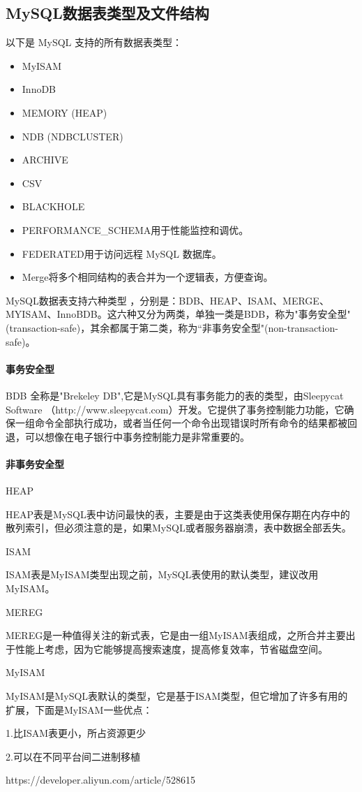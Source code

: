 \documentclass[../../../interview-questions.tex]{subfiles}
\begin{document}
\subsection{MySQL数据表类型及文件结构}

以下是 MySQL 支持的所有数据表类型：

\begin{itemize}
    \item {MyISAM}
    \item {InnoDB}
    \item {MEMORY (HEAP)}
    \item {NDB (NDBCLUSTER)}
    \item {ARCHIVE}
    \item {CSV}
    \item {BLACKHOLE}
    \item {PERFORMANCE\_SCHEMA}用于性能监控和调优。
    \item {FEDERATED}用于访问远程 MySQL 数据库。
    \item {Merge}将多个相同结构的表合并为一个逻辑表，方便查询。
\end{itemize}

MySQL数据表支持六种类型 ，分别是：BDB、HEAP、ISAM、MERGE、MYISAM、InnoBDB。这六种又分为两类，单独一类是BDB，称为"事务安全型"(transaction-safe)，其余都属于第二类，称为“非事务安全型"(non-transaction-safe)。

\paragraph{事务安全型}

BDB 全称是"Brekeley DB",它是MySQL具有事务能力的表的类型，由Sleepycat Software （http://www.sleepycat.com）开发。它提供了事务控制能力功能，它确保一组命令全部执行成功，或者当任何一个命令出现错误时所有命令的结果都被回退，可以想像在电子银行中事务控制能力是非常重要的。

\paragraph{非事务安全型}

HEAP

HEAP表是MySQL表中访问最快的表，主要是由于这类表使用保存期在内存中的散列索引，但必须注意的是，如果MySQL或者服务器崩溃，表中数据全部丢失。

ISAM

ISAM表是MyISAM类型出现之前，MySQL表使用的默认类型，建议改用MyISAM。

MEREG

MEREG是一种值得关注的新式表，它是由一组MyISAM表组成，之所合并主要出于性能上考虑，因为它能够提高搜索速度，提高修复效率，节省磁盘空间。

MyISAM

MyISAM是MySQL表默认的类型，它是基于ISAM类型，但它增加了许多有用的扩展，下面是MyISAM一些优点：

1.比ISAM表更小，所占资源更少

2.可以在不同平台间二进制移植


https://developer.aliyun.com/article/528615
\end{document}
